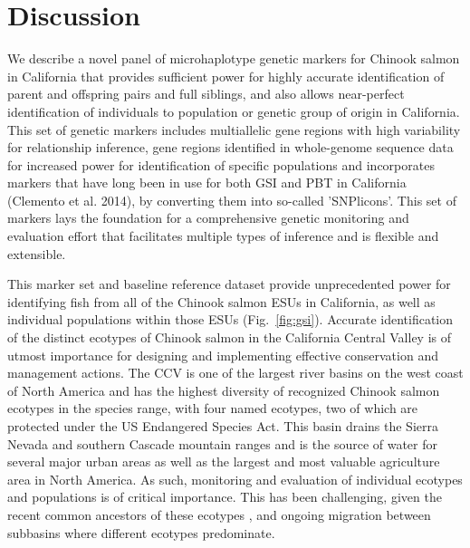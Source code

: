 \section*{Discussion}

We describe a novel panel of microhaplotype genetic markers for Chinook salmon
in California that provides sufficient power for highly accurate identification 
of parent and offspring pairs and full siblings, and also allows near-perfect
identification of individuals to population or genetic group of origin in California. 
This set of genetic markers includes multiallelic gene regions with high variability for
relationship inference, gene regions identified in whole-genome sequence data
for increased power for identification of specific populations and incorporates markers that have
long been in use for both GSI and PBT in California (Clemento et al. 2014), by converting them
into so-called 'SNPlicons'. This set of markers lays the foundation for a comprehensive 
genetic monitoring and evaluation effort that facilitates multiple types of inference 
and is flexible and extensible.


This marker set and baseline reference dataset provide
unprecedented power for identifying fish from all of the Chinook salmon ESUs in California,
as well as individual populations within those ESUs (Fig.~\ref{fig:gsi}).
Accurate identification of the distinct ecotypes of Chinook salmon in the
California Central Valley is of utmost importance for designing and implementing
effective conservation and management actions. The CCV is one of the largest river
basins on the west coast of North America and has the highest diversity of recognized Chinook salmon
ecotypes in the species range, with four named ecotypes, two of which are protected
under the US Endangered Species Act. This basin drains the Sierra Nevada and southern Cascade
mountain ranges and is the source of water for several major urban areas as well as the
largest and most valuable agriculture area in North America. As such, monitoring and
evaluation of individual ecotypes and populations is of critical importance. This has been challenging,
given the recent common ancestors of these ecotypes \citep{clemento2014evaluation}, and
ongoing migration between subbasins where different ecotypes predominate.


